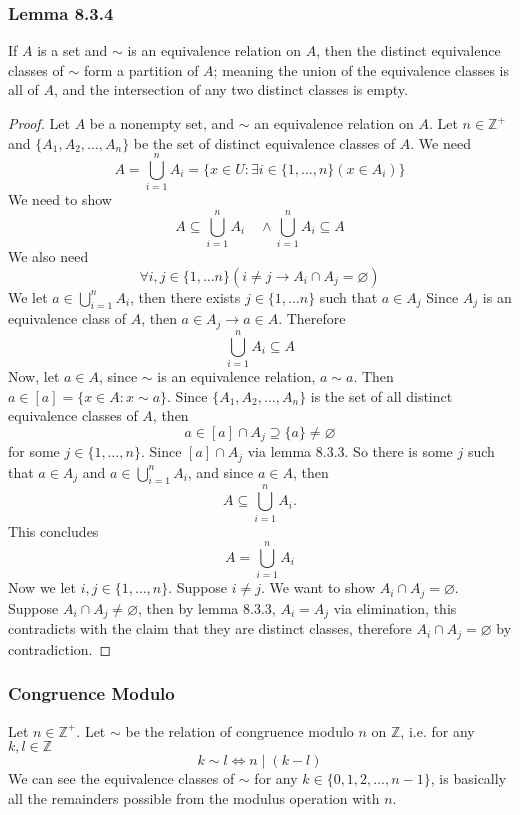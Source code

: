 \documentclass[12pt]{book}
\newcommand{\Z}{\mathbb{Z}}
\newcommand{\paren}[1]{\left( #1 \right)}
\newcommand{\then}{\rightarrow}
\begin{document}
\subsubsection{Lemma 8.3.4}
If $A$ is a set and $\sim$ is an equivalence relation on $A$, then the distinct equivalence classes of $\sim$ form a partition of $A$; meaning the union of the equivalence classes is all of $A$, and the intersection of any two distinct classes is empty. 
\begin{proof}
    Let $A$ be a nonempty set, and $\sim$ an equivalence relation on $A$. Let $n \in \Z^+$ and $\{A_1, A_2, \ldots , A_n\}$ be the set of distinct equivalence classes of $A$. We need
    \[
    A = \bigcup_{i=1}^{n}A_i = \{ x \in U \colon \exists i \in \{1,\ldots,n\} \paren{x \in A_i}\}
    \]
    We need to show
    \[
    A \subseteq \bigcup_{i=1}^{n}A_i  \quad \wedge \bigcup_{i=1}^{n}A_i  \subseteq A
    \]
    We also need
    \[
    \forall i,j \in \{1,\ldots n\}\paren{i \neq j \then A_i \cap A_j = \varnothing}
    \]
    We let $a \in \bigcup_{i=1}^{n}A_i$, then there exists $j \in \{1,\ldots n\} $ such that $a \in A_j$ Since $A_j$ is an equivalence class of $A$, then $a \in A_j \then a \in A$. Therefore
    \[
    \bigcup_{i=1}^{n}A_i  \subseteq A
    \]
    Now, let $a \in A$, since $\sim$ is an equivalence relation, $a \sim a$. Then $a \in [a] = \{ x \in A \colon x\sim a\}$. Since $\{A_1,A_2, \ldots,A_n\}$ is the set of all distinct equivalence classes of $A$, then
    \[
    a \in [a] \cap A_j \supseteq \{a\} \neq \varnothing
    \]
    for some $j \in \{1,\ldots,n\}$. Since $[a] \cap A_j$ via lemma $8.3.3$. So there is some $j$ such that $a \in A_j$ and $a \in \bigcup_{i=1}^{n}A_i  $, and since $a \in A$, then 
    \[
    A \subseteq  \bigcup_{i=1}^{n}A_i .
    \]
    This concludes
    \[
    A = \bigcup_{i=1}^{n}A_i 
    \]
    Now we let $i,j \in \{1,\ldots,n\}$. Suppose $i \neq j$. We want to show $A_i \cap A_j = \varnothing$. Suppose $A_i \cap A_j \neq \varnothing$, then by lemma 8.3.3, $A_i = A_j$ via elimination, this contradicts with the claim that they are distinct classes, therefore $A_i \cap A_j = \varnothing$ by contradiction. 
\end{proof}


\subsubsection{Congruence Modulo}
Let $n \in \Z^+$. Let $\sim$ be the relation of congruence modulo $n$ on $\Z$, i.e. for any $k,l \in \Z$
\[
k \sim l \iff n \mid (k-l)
\]
We can see the equivalence classes of $\sim$ for any $k \in \{0,1,2,\ldots, n-1\}$, is basically all the remainders possible from the modulus operation with $n$.
\end{document}
